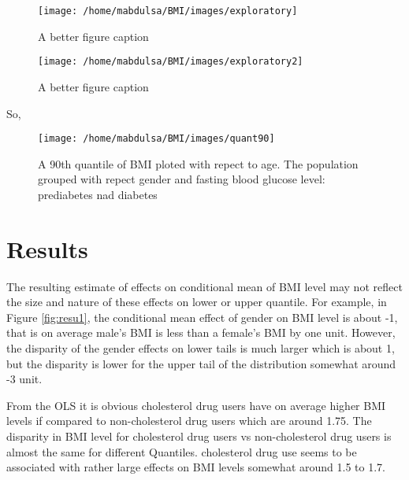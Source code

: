 \documentclass[
  12pt,
]{article}
\begin{document}
\begin{figure}

{\centering \texttt{[image: /home/mabdulsa/BMI/images/exploratory]} 

}

\caption{A better figure caption}\label{fig:data}
\end{figure}

\begin{figure}

{\centering \texttt{[image: /home/mabdulsa/BMI/images/exploratory2]} 

}

\caption{A better figure caption}\label{fig:unnamed-chunk-1}
\end{figure}

So,

\begin{figure}

{\centering \texttt{[image: /home/mabdulsa/BMI/images/quant90]} 

}

\caption{A 90th quantile of BMI ploted with repect to age. The population grouped with repect gender and fasting blood glucose level: prediabetes nad diabetes}\label{fig:unnamed-chunk-2}
\end{figure}

\section{Results}

The resulting estimate of effects on conditional mean of BMI level may not reflect the size and nature of these effects on lower or upper quantile. For example, in Figure \ref{fig:resu1}, the conditional mean effect of gender on BMI level is about -1, that is on average male's BMI is less than a female's BMI by one unit. However, the disparity of the gender effects on lower tails is much larger which is about 1, but the disparity is lower for the upper tail of the distribution somewhat around -3 unit.

From the OLS it is obvious cholesterol drug users have on average higher BMI levels if compared to non-cholesterol drug users which are around 1.75. The disparity in BMI level for cholesterol drug users vs non-cholesterol drug users is almost the same for different Quantiles. cholesterol drug use seems to be associated with rather large effects on BMI levels somewhat around 1.5 to 1.7.
\end{document}
